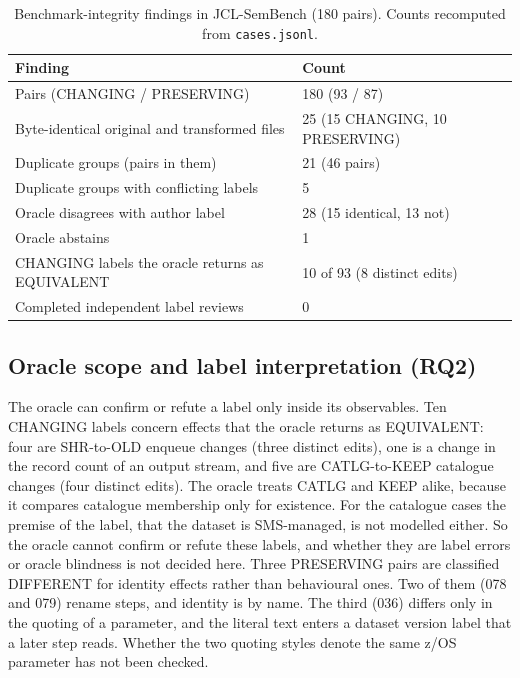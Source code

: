 \documentclass[conference]{IEEEtran}
\begin{document}
\begin{table}[t]
\caption{Benchmark-integrity findings in JCL-SemBench (180 pairs). Counts recomputed from \texttt{cases.jsonl}.}
\label{tab:integrity}
\centering
\small
\begin{tabular}{@{}p{4.7cm}p{2.6cm}@{}}
\toprule
Finding & Count \\
\midrule
Pairs (CHANGING / PRESERVING) & 180 (93 / 87) \\
Byte-identical original and transformed files & 25 (15 CHANGING, 10 PRESERVING) \\
Duplicate groups (pairs in them) & 21 (46 pairs) \\
Duplicate groups with conflicting labels & 5 \\
Oracle disagrees with author label & 28 (15 identical, 13 not) \\
Oracle abstains & 1 \\
CHANGING labels the oracle returns as EQUIVALENT & 10 of 93 (8 distinct edits) \\
Completed independent label reviews & 0 \\
\bottomrule
\end{tabular}
\end{table}

\subsection{Oracle scope and label interpretation (RQ2)}
The oracle can confirm or refute a label only inside its observables. Ten CHANGING labels concern effects that the oracle returns as EQUIVALENT: four are SHR-to-OLD enqueue changes (three distinct edits), one is a change in the record count of an output stream, and five are CATLG-to-KEEP catalogue changes (four distinct edits). The oracle treats CATLG and KEEP alike, because it compares catalogue membership only for existence. For the catalogue cases the premise of the label, that the dataset is SMS-managed, is not modelled either. So the oracle cannot confirm or refute these labels, and whether they are label errors or oracle blindness is not decided here. Three PRESERVING pairs are classified DIFFERENT for identity effects rather than behavioural ones. Two of them (078 and 079) rename steps, and identity is by name. The third (036) differs only in the quoting of a parameter, and the literal text enters a dataset version label that a later step reads. Whether the two quoting styles denote the same z/OS parameter has not been checked.
\end{document}
